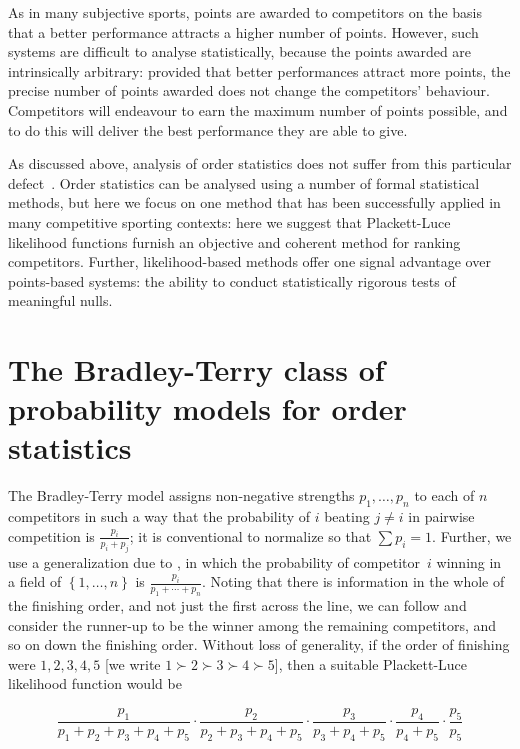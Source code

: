 \documentclass{article}
\begin{document}
As in many subjective sports, points are awarded to competitors on the
basis that a better performance attracts a higher number of points.
However, such systems are difficult to analyse statistically, because
the points awarded are intrinsically arbitrary: provided that better
performances attract more points, the precise number of points awarded
does not change the competitors' behaviour.  Competitors will
endeavour to earn the maximum number of points possible, and to do
this will deliver the best performance they are able to give.

As discussed above, analysis of order statistics does not suffer from
this particular defect~\citep{aldous2017}.  Order statistics can be
analysed using a number of formal statistical methods, but here we
focus on one method that has been successfully applied in many
competitive sporting contexts: here we suggest that Plackett-Luce
likelihood functions furnish an objective and coherent method for
ranking competitors.  Further, likelihood-based methods offer one
signal advantage over points-based systems: the ability to conduct
statistically rigorous tests of meaningful nulls.

\section{The Bradley-Terry class of probability models for order statistics}

The Bradley-Terry model \citep{bradley1954} assigns non-negative
strengths $p_1,\ldots, p_n$ to each of $n$ competitors in such a way
that the probability of $i$ beating $j\neq i$ in pairwise competition
is $\frac{p_i}{p_i+p_j}$; it is conventional to normalize so that
$\sum p_i=1$.  Further, we use a generalization due to
\citep{luce1959}, in which the probability of competitor~$i$ winning
in a field of $\left\lbrace 1,\ldots, n\right\rbrace$ is
$\frac{p_i}{p_1+\cdots +p_n}$.  Noting that there is information in
the whole of the finishing order, and not just the first across the
line, we can follow \citet{plackett1975} and consider the runner-up to
be the winner among the remaining competitors, and so on down the
finishing order. Without loss of generality, if the order of finishing
were $1,2,3,4,5$ [we write $1\succ 2\succ 3\succ 4\succ5$], then a
suitable Plackett-Luce likelihood function would be

\begin{equation}\label{competitors_1_to_5_likelihood}
\frac{p_1}{p_1+p_2+p_3+p_4+p_5}\cdot
\frac{p_2}{p_2+p_3+p_4+p_5}\cdot
\frac{p_3}{p_3+p_4+p_5}\cdot
\frac{p_4}{p_4+p_5}\cdot
\frac{p_5}{p_5}
\end{equation}
\end{document}
